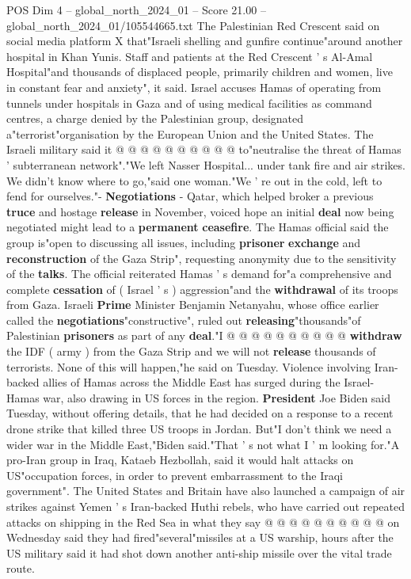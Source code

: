 \begin{textsample}{POS Dim 4 – global\_north\_2024\_01 – Score 21.00 – global\_north\_2024\_01/105544665.txt}
The Palestinian Red Crescent said on social media platform X that"Israeli shelling and gunfire continue"around another hospital in Khan Yunis.
Staff and patients at the Red Crescent ' s Al-Amal Hospital"and thousands of displaced people, primarily children and women, live in constant fear and anxiety", it said.
Israel accuses Hamas of operating from tunnels under hospitals in Gaza and of using medical facilities as command centres, a charge denied by the Palestinian group, designated a"terrorist"organisation by the European Union and the United States.
The Israeli military said it @ @ @ @ @ @ @ @ @ @ to"neutralise the threat of Hamas ' subterranean network"."We left Nasser Hospital... under tank fire and air strikes.
We didn't know where to go,"said one woman."We ' re out in the cold, left to fend for ourselves."- \textbf{Negotiations} - Qatar, which helped broker a previous \textbf{truce} and hostage \textbf{release} in November, voiced hope an initial \textbf{deal} now being negotiated might lead to a \textbf{permanent} \textbf{ceasefire}.
The Hamas official said the group is"open to discussing all issues, including \textbf{prisoner} \textbf{exchange} and \textbf{reconstruction} of the Gaza Strip", requesting anonymity due to the sensitivity of the \textbf{talks}.
The official reiterated Hamas ' s demand for"a comprehensive and complete \textbf{cessation} of ( Israel ' s ) aggression"and the \textbf{withdrawal} of its troops from Gaza.
Israeli \textbf{Prime} Minister Benjamin Netanyahu, whose office earlier called the \textbf{negotiations}"constructive", ruled out \textbf{releasing}"thousands"of Palestinian \textbf{prisoners} as part of any \textbf{deal}."I @ @ @ @ @ @ @ @ @ @ \textbf{withdraw} the IDF ( army ) from the Gaza Strip and we will not \textbf{release} thousands of terrorists.
None of this will happen,"he said on Tuesday.
Violence involving Iran-backed allies of Hamas across the Middle East has surged during the Israel-Hamas war, also drawing in US forces in the region. \textbf{President} Joe Biden said Tuesday, without offering details, that he had decided on a response to a recent drone strike that killed three US troops in Jordan.
But"I don't think we need a wider war in the Middle East,"Biden said."That ' s not what I ' m looking for."A pro-Iran group in Iraq, Kataeb Hezbollah, said it would halt attacks on US"occupation forces, in order to prevent embarrassment to the Iraqi government".
The United States and Britain have also launched a campaign of air strikes against Yemen ' s Iran-backed Huthi rebels, who have carried out repeated attacks on shipping in the Red Sea in what they say @ @ @ @ @ @ @ @ @ @ on Wednesday said they had fired"several"missiles at a US warship, hours after the US military said it had shot down another anti-ship missile over the vital trade route.

\end{textsample}
